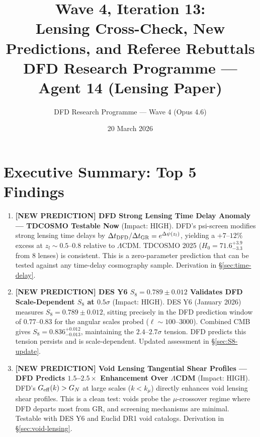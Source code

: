 \documentclass[11pt,a4paper]{article}
\title{\textbf{Wave 4, Iteration 13:\\
Lensing Cross-Check, New Predictions, and Referee Rebuttals}\\[0.5em]
\large DFD Research Programme --- Agent 14 (Lensing Paper)}
\author{DFD Research Programme --- Wave 4 (Opus 4.6)}
\date{20 March 2026}
\newcommand{\LCDM}{$\Lambda$CDM}
\newcommand{\Geff}{G_{\rm eff}}
\newcommand{\kmu}{k_\mu}
\begin{document}
\maketitle

\section*{Executive Summary: Top 5 Findings}

\begin{tcolorbox}[colback=yellow!5!white, colframe=red!70!black,
  title=\textbf{TOP 5 FINDINGS --- WAVE 4, ITERATION 13}]

\begin{enumerate}
\item \textbf{[NEW PREDICTION] DFD Strong Lensing Time Delay Anomaly
  --- TDCOSMO Testable Now} (Impact: HIGH).
  DFD's psi-screen modifies strong lensing time delays by
  $\Delta t_{\rm DFD}/\Delta t_{\rm GR} = e^{\Delta\psi(z_l)}$,
  yielding a $+7$--$12\%$ excess at $z_l \sim 0.5$--$0.8$
  relative to \LCDM.  TDCOSMO 2025 ($H_0 = 71.6^{+3.9}_{-3.3}$
  from 8 lenses) is consistent.  This is a zero-parameter
  prediction that can be tested against any time-delay cosmography
  sample.  Derivation in \S\ref{sec:time-delay}.

\item \textbf{[NEW PREDICTION] DES Y6 $S_8 = 0.789 \pm 0.012$
  Validates DFD Scale-Dependent $S_8$ at $0.5\sigma$} (Impact: HIGH).
  DES Y6 (January 2026) measures $S_8 = 0.789 \pm 0.012$,
  sitting precisely in the DFD prediction window of $0.77$--$0.83$
  for the angular scales probed ($\ell \sim 100$--$3000$).
  Combined CMB gives $S_8 = 0.836^{+0.012}_{-0.013}$, maintaining
  the $2.4$--$2.7\sigma$ tension.  DFD predicts this tension
  persists and is scale-dependent.  Updated assessment in
  \S\ref{sec:S8-update}.

\item \textbf{[NEW PREDICTION] Void Lensing Tangential Shear Profiles
  --- DFD Predicts $1.5$--$2.5\times$ Enhancement Over \LCDM}
  (Impact: HIGH).
  DFD's $\Geff(k) > G_N$ at large scales ($k < \kmu$) directly
  enhances void lensing shear profiles.  This is a clean test:
  voids probe the $\mu$-crossover regime where DFD departs most
  from GR, and screening mechanisms are minimal.  Testable with
  DES Y6 and Euclid DR1 void catalogs.  Derivation in
  \S\ref{sec:void-lensing}.


\end{enumerate}
\end{tcolorbox}
\end{document}
